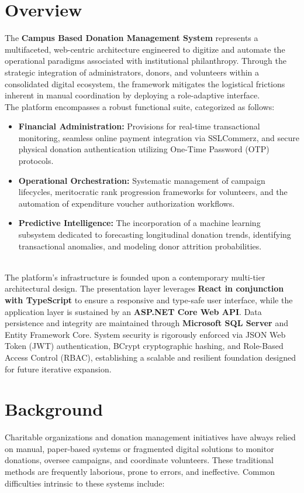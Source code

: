 \section{Overview} The \textbf{Campus Based Donation Management System} represents a multifaceted, web-centric architecture engineered to digitize and automate the operational paradigms associated with institutional philanthropy. Through the strategic integration of administrators, donors, and volunteers within a consolidated digital ecosystem, the framework mitigates the logistical frictions inherent in manual coordination by deploying a role-adaptive interface.
\\The platform encompasses a robust functional suite, categorized as follows: \begin{itemize} \item \textbf{Financial Administration:} Provisions for real-time transactional monitoring, seamless online payment integration via SSLCommerz, and secure physical donation authentication utilizing One-Time Password (OTP) protocols. \item \textbf{Operational Orchestration:} Systematic management of campaign lifecycles, meritocratic rank progression frameworks for volunteers, and the automation of expenditure voucher authorization workflows. \item \textbf{Predictive Intelligence:} The incorporation of a machine learning subsystem dedicated to forecasting longitudinal donation trends, identifying transactional anomalies, and modeling donor attrition probabilities. \end{itemize}
\\The platform's infrastructure is founded upon a contemporary multi-tier architectural design. The presentation layer leverages \textbf{React in conjunction with TypeScript} to ensure a responsive and type-safe user interface, while the application layer is sustained by an \textbf{ASP.NET Core Web API}. Data persistence and integrity are maintained through \textbf{Microsoft SQL Server} and Entity Framework Core. System security is rigorously enforced via JSON Web Token (JWT) authentication, BCrypt cryptographic hashing, and Role-Based Access Control (RBAC), establishing a scalable and resilient foundation designed for future iterative expansion.

\section{Background}
Charitable organizations and donation management initiatives have always relied on manual, paper-based systems or fragmented digital solutions to monitor donations, oversee campaigns, and coordinate volunteers. These traditional methods are frequently laborious, prone to errors, and ineffective. Common difficulties intrinsic to these systems include:


